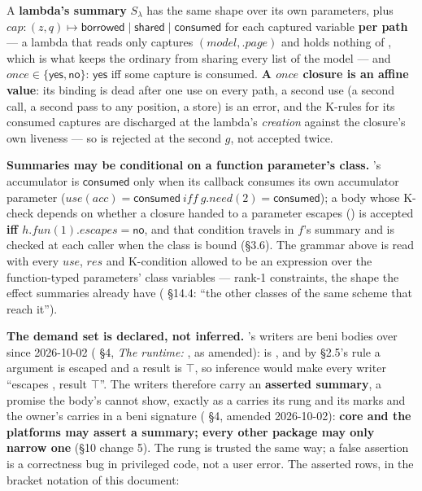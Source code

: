 A \textbf{lambda's summary} $S_{\lambda}$ has the same shape over its own parameters, plus $\mathit{cap}:(z,\allowbreak{}q)\mapsto \mathsf{borrowed}\mid \mathsf{shared}\mid \mathsf{consumed}$ for each captured variable \textbf{per path} — a lambda that reads only  captures $(\mathit{model},\allowbreak{}.\mathit{page})$ and holds nothing of , which is what keeps the ordinary  from sharing every list of the model — and $\mathit{once}\in \{\mathsf{yes},\allowbreak{}\mathsf{no}\}$: $\mathsf{yes}$ iff some capture is consumed. \textbf{A $\mathit{once}$ closure is an affine value}: its binding is dead after one use on every path, a second use (a second call, a second pass to any position, a store) is an error, and the K-rules for its consumed captures are discharged at the lambda's \emph{creation} against the closure's own liveness — so  is rejected at the second $g$, not accepted twice.

\textbf{Summaries may be conditional on a function parameter's class.} 's accumulator is $\mathsf{consumed}$ only when its callback consumes its own accumulator parameter ($\mathit{use}(\mathit{acc})=\mathsf{consumed}\ \mathit{iff}\ g.\mathit{need}(2)=\mathsf{consumed}$); a body whose K-check depends on whether a closure handed to a parameter escapes () is accepted \textbf{iff $h.\mathit{fun}(1).\mathit{escapes}=\mathsf{no}$}, and that condition travels in $f$'s summary and is checked at each caller when the class is bound (§3.6). The grammar above is read with every $\mathit{use}$, $\mathit{res}$ and K-condition allowed to be an expression over the function-typed parameters' class variables — rank-1 constraints, the shape the effect summaries already have ( §14.4: “the other classes of the same scheme that reach it”).

\textbf{The demand set is declared, not inferred.} 's writers are beni bodies over  since 2026-10-02 ( §4, \emph{The runtime: }, as amended):  is , and by §2.5's rule a  argument is escaped and a  result is $\top$, so inference would make every writer “escapes , result $\top$”. The writers therefore carry an \textbf{asserted summary}, a promise the body's  cannot show, exactly as a  carries its rung and its  marks and the owner's  carries  in a beni signature ( §4, amended 2026-10-02): \textbf{core and the platforms may assert a summary; every other package may only narrow one} (§10 change 5). The rung is trusted the same way; a false assertion is a correctness bug in privileged code, not a user error. The asserted rows, in the bracket notation of this document:

